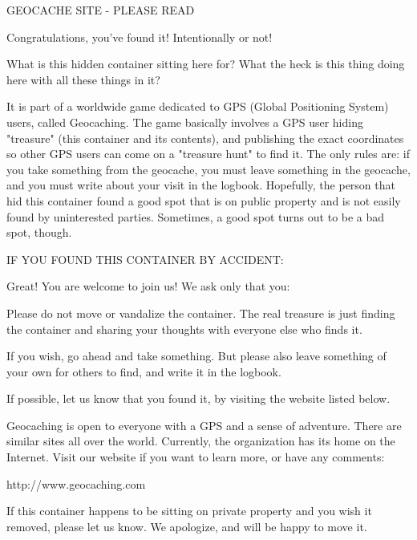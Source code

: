 GEOCACHE SITE - PLEASE READ

Congratulations, you've found it! Intentionally or not!

What is this hidden container sitting here for?  What the heck is this thing doing here with all these things in it?

It is part of a worldwide game dedicated to GPS (Global Positioning System) users, called Geocaching. The game basically involves a GPS user hiding "treasure" (this container and its contents), and publishing the exact coordinates so other GPS users can come on a "treasure hunt" to find it. The only rules are: if you take something from the geocache, you must leave something in the geocache, and you must write about your visit in the logbook. Hopefully, the person that hid this container found a good spot that is on public property and is not easily found by uninterested parties. Sometimes, a good spot turns out to be a bad spot, though.

IF YOU FOUND THIS CONTAINER BY ACCIDENT:

Great!  You are welcome to join us!  We ask only that you:
\begin{itemize*}
	\item Please do not move or vandalize the container. The real treasure is just finding the container and sharing your thoughts with everyone else who finds it.
	\item If you wish, go ahead and take something. But please also leave something of your own for others to find, and write it in the logbook.
	\item If possible, let us know that you found it, by visiting the website listed below.
\end{itemize*}
Geocaching is open to everyone with a GPS and a sense of adventure.  There are similar sites all over the world. Currently, the organization has its home on the Internet. Visit our website if you want to learn more, or have any comments:

http://www.geocaching.com

If this container happens to be sitting on private property and you wish it removed, please let us know. We apologize, and will be happy to move it.

